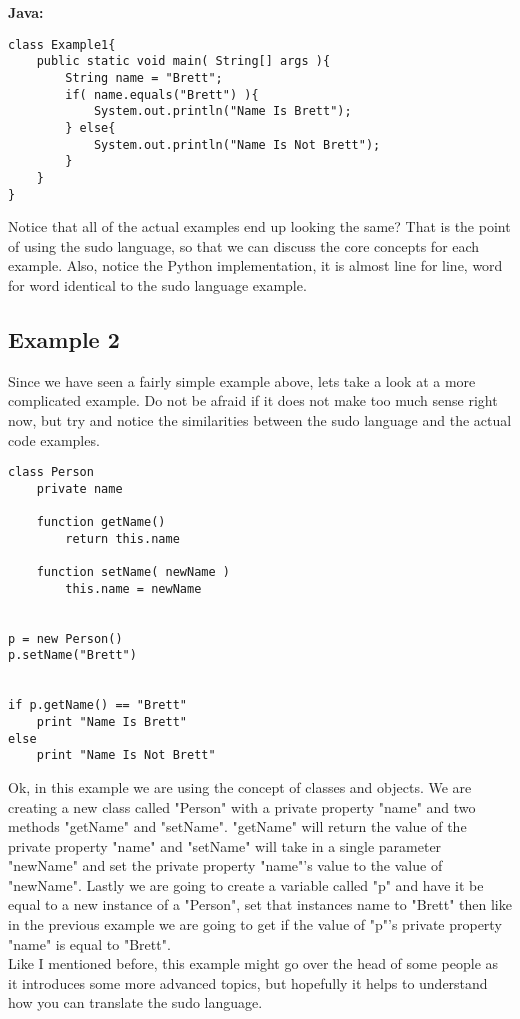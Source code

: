 {\bf Java:}
\begin{lstlisting}
class Example1{
    public static void main( String[] args ){
        String name = "Brett";
        if( name.equals("Brett") ){
            System.out.println("Name Is Brett");
        } else{
            System.out.println("Name Is Not Brett");
        }
    }
}
\end{lstlisting}

Notice that all of the actual examples end up looking the same? That is the point of using the sudo language, so that we can
discuss the core concepts for each example. Also, notice the Python implementation, it is almost line for line, word for word
identical to the sudo language example.

\subsection{Example 2}
Since we have seen a fairly simple example above, lets take a look at a more complicated example. Do not be afraid if it does not make
too much sense right now, but try and notice the similarities between the sudo language and the actual code examples.

\begin{lstlisting}
class Person
    private name
    
    function getName()
        return this.name
    
    function setName( newName )
        this.name = newName


p = new Person()
p.setName("Brett")


if p.getName() == "Brett"
    print "Name Is Brett"
else
    print "Name Is Not Brett"
\end{lstlisting}

Ok, in this example we are using the concept of classes and objects. We are creating a new class called "Person" with a
private property "name" and two methods "getName" and "setName". "getName" will return the value of the private property "name" and
"setName" will take in a single parameter "newName" and set the private property "name"'s value to the value of "newName". Lastly we
are going to create a variable called "p" and have it be equal to a new instance of a "Person", set that instances name to "Brett" then like 
in the previous example we are going to get if the value of "p"'s private property "name" is equal to "Brett".
\newline
\\
Like I mentioned before, this example might go over the head of some people as it introduces some more advanced topics, but hopefully it
helps to understand how you can translate the sudo language.

